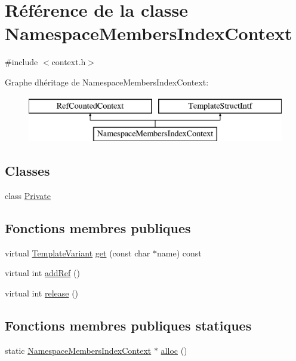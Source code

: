 \hypertarget{class_namespace_members_index_context}{}\section{Référence de la classe Namespace\+Members\+Index\+Context}
\label{class_namespace_members_index_context}


{\ttfamily \#include $<$context.\+h$>$}

Graphe d\textquotesingle{}héritage de Namespace\+Members\+Index\+Context\+:\begin{figure}[H]
\begin{center}
\leavevmode
\includegraphics[height=2.000000cm]{class_namespace_members_index_context}
\end{center}
\end{figure}
\subsection*{Classes}
\begin{DoxyCompactItemize}
\item 
class \hyperlink{class_namespace_members_index_context_1_1_private}{Private}
\end{DoxyCompactItemize}
\subsection*{Fonctions membres publiques}
\begin{DoxyCompactItemize}
\item 
virtual \hyperlink{class_template_variant}{Template\+Variant} \hyperlink{class_namespace_members_index_context_a7321a5d13b362396aca25dd535afdd2b}{get} (const char $\ast$name) const 
\item 
virtual int \hyperlink{class_namespace_members_index_context_a48abb994ec8b22e257d71077f11bd75e}{add\+Ref} ()
\item 
virtual int \hyperlink{class_namespace_members_index_context_aa80fcd8abd99dbf8f067ec0dec4d52a8}{release} ()
\end{DoxyCompactItemize}
\subsection*{Fonctions membres publiques statiques}
\begin{DoxyCompactItemize}
\item 
static \hyperlink{class_namespace_members_index_context}{Namespace\+Members\+Index\+Context} $\ast$ \hyperlink{class_namespace_members_index_context_a580c785b2f59d7034876f28046ffc38c}{alloc} ()
\end{DoxyCompactItemize}


